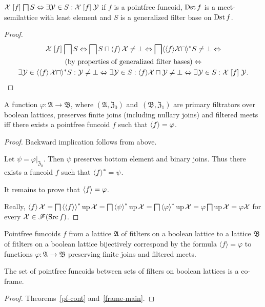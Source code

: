\begin{prop}
$\mathcal{X}\mathrel{\left[f\right]}\bigsqcap S\Leftrightarrow\exists\mathcal{Y}\in S:\mathcal{X}\mathrel{\left[f\right]}\mathcal{Y}$
if $f$ is a pointfree funcoid, $\operatorname{Dst} f$ is a meet-semilattice with
least element and $S$ is a generalized filter base on $\operatorname{Dst} f$.\end{prop}
\begin{proof}
~
\begin{multline*}
\mathcal{X}\mathrel{\left[f\right]}\bigsqcap S\Leftrightarrow\bigsqcap S\sqcap\left\langle f\right\rangle\mathcal{X}\neq\bot\Leftrightarrow\bigsqcap\langle\langle f\rangle\mathcal{X}\sqcap\rangle^{\ast}S\neq\bot\Leftrightarrow\\
\text{(by properties of generalized filter bases)}\Leftrightarrow\\
\exists\mathcal{Y}\in\langle\left\langle f\right\rangle\mathcal{X}\sqcap\rangle^{\ast}S:\mathcal{Y}\neq\bot\Leftrightarrow\exists\mathcal{Y}\in S:\langle f\rangle\mathcal{X}\sqcap\mathcal{Y}\neq\bot\Leftrightarrow\exists\mathcal{Y}\in S:\mathcal{X}\mathrel{\left[f\right]}\mathcal{Y}.
\end{multline*}
\end{proof}
\begin{thm}
\label{pfcd-as-func}A function $\varphi:\mathfrak{A}\rightarrow\mathfrak{B}$,
where $(\mathfrak{A},\mathfrak{Z}_{0})$ and~$(\mathfrak{B},\mathfrak{Z}_{1})$
are primary filtrators over boolean lattices, preserves finite joins
(including nullary joins) and filtered meets iff there exists a pointfree
funcoid $f$ such that $\left\langle f\right\rangle=\varphi$.\end{thm}
\begin{proof}
Backward implication follows from above.

Let $\psi=\varphi|_{\mathfrak{Z}_{0}}$. Then $\psi$ preserves bottom
element and binary joins. Thus there exists a funcoid $f$ such that
$\left\langle f\right\rangle ^{\ast}=\psi$.

It remains to prove that $\left\langle f\right\rangle=\varphi$.

Really, $\left\langle f\right\rangle\mathcal{X}=\bigsqcap\left\langle \left\langle f\right\rangle\right\rangle ^{\ast}\operatorname{up}\mathcal{X}=\bigsqcap\left\langle \psi\right\rangle ^{\ast}\operatorname{up}\mathcal{X}=\bigsqcap\left\langle \varphi\right\rangle ^{\ast}\operatorname{up}\mathcal{X}=\varphi\bigsqcap\operatorname{up}\mathcal{X}=\varphi\mathcal{X}$
for every $\mathcal{X}\in\mathscr{F}(\operatorname{Src} f)$.\end{proof}
\begin{cor}
Pointfree funcoids $f$ from a lattice $\mathfrak{A}$ of fitlters
on a boolean lattice to a lattice $\mathfrak{B}$ of fitlters
on a boolean lattice bijectively correspond by the formula
$\langle f\rangle=\varphi$ to functions $\varphi:\mathfrak{A}\rightarrow\mathfrak{B}$
preserving finite joins and filtered meets.\end{cor}
\begin{thm}
The set of pointfree funcoids between sets of filters on boolean
lattices is a co-frame.\end{thm}
\begin{proof}
Theorems~\ref{pf-cont} and~\ref{frame-main}.
\end{proof}

